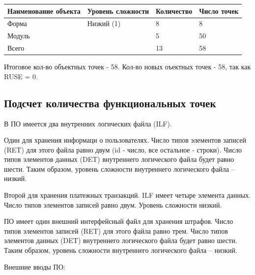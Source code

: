 \documentclass[a4paper,14pt]{article}
\begin{document}
\begin{table}[H]
\begin{tabular}{|l|l|l|l|}
\hline
Наименование объекта & Уровень сложности & Количество & Число точек \\ \hline
Форма                & Низкий (1)        & 8          & 8           \\ \hline
Модуль               &                   & 5          & 50          \\ \hline
Всего                &                   & 13         & 58          \\ \hline
\end{tabular}
\end{table}

Итоговое кол-во объектных точек - 58. Кол-во новых оъектных точек - 58, так как RUSE = 0.

\subsection*{Подсчет количества функциональных точек}

В  ПО имеется  два  внутренних  логических  файла  (ILF). 

Один для хранения  информаци о пользователях. Число типов элементов записей (RET) для этого файла равно двум (id - число, все остальное - строки). Число  типов  элементов  данных  (DET)  внутреннего  логического файла  будет  равно шести. Таким  образом,  уровень  сложности  внутреннего логического файла – низкий.

Второй для хранения  платежных транзакций. ILF имеет четыре элемента данных. Число типов элементов записей равно двум. Уровень сложности низкий.

ПО имеет один внешний интерфейсный файл для хранения штрафов. Число типов элементов записей (RET) для этого файла равно трем. Число  типов  элементов  данных  (DET)  внутреннего  логического файла  будет  равно шести. Таким  образом,  уровень  сложности  внутреннего логического файла – низкий.

Внешние вводы ПО:
\end{document}
